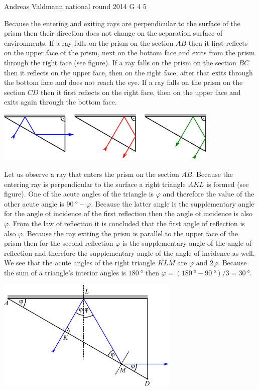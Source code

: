 \documentclass[11pt]{article}
\begin{document}
{Andreas Valdmann} %
{national round} %
{2014} %
{G 4} %
{5} %
{

\ifEngSolution
\osa Because the entering and exiting rays are perpendicular to the surface of the prism then their direction does not change on the separation surface of environments. If a ray falls on the prism on the section $AB$ then it first reflects on the upper face of the prism, next on the bottom face and exits from the prism through the right face (see figure). If a ray falls on the prism on the section $BC$ then it reflects on the upper face, then on the right face, after that exits through the bottom face and does not reach the eye. If a ray falls on the prism on the section $CD$ then it first reflects on the right face, then on the upper face and exits again through the bottom face. 
\begin{center}
  \includegraphics[width=0.8\textwidth]{2014-v3g-04-periskoopprillid_lahendus_joonis1}
\end{center}
\osa Let us observe a ray that enters the prism on the section $AB$. Because the entering ray is perpendicular to the surface a right triangle $AKL$ is formed (see figure). One of the acute angles of the triangle is $\varphi$ and therefore the value of the other acute angle is $\SI{90}{\degree}-\varphi$. Because the latter angle is the supplementary angle for the angle of incidence of the first reflection then the angle of incidence is also $\varphi$. From the law of reflection it is concluded that the first angle of reflection is also $\varphi$. Because the ray exiting the prism is parallel to the upper face of the prism then for the second reflection $\varphi$ is the supplementary angle of the angle of reflection and therefore the supplementary angle of the angle of incidence as well. We see that the acute angles of the right triangle $KLM$ are $\varphi$ and $2\varphi$. Because the sum of a triangle’s interior angles is $\SI{180}{\degree}$ then $\varphi=(\SI{180}{\degree}-\SI{90}{\degree})/3=\SI{30}{\degree}$.
\begin{center}
  \includegraphics[width=0.65\textwidth]{2014-v3g-04-periskoopprillid_lahendus_joonis2}

\end{center}}
\end{document}
